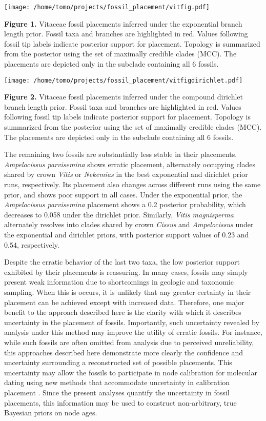 \documentclass[12pt]{article}
\begin{document}
\texttt{[image: /home/tomo/projects/fossil\_placement/vitfig.pdf]}

\textbf{Figure 1.} Vitaceae fossil placements inferred under the
exponential branch length prior. Fossil taxa and branches are
highlighted in red. Values following fossil tip labels indicate
posterior support for placement. Topology is summarized from the
posterior using the set of maximally credible clades (MCC). The placements are depicted only in the subclade containing all 6 fossils.

\texttt{[image: /home/tomo/projects/fossil\_placement/vitfigdirichlet.pdf]}

\textbf{Figure 2.}  Vitaceae fossil placements inferred
under the compound dirichlet branch length prior. Fossil taxa and
branches are highlighted in red. Values following fossil tip labels
indicate posterior support for placement. Topology is summarized from
the posterior using the set of maximally credible clades (MCC). The placements are depicted only in the subclade containing all 6 fossils.

The remaining two fossils are substantially less stable in their
placements. \emph{Ampelocissus parvisemina} shows erratic placement,
alternately occupying clades shared by crown \emph{Vitis} or
\emph{Nekemias} in the best exponential and dirichlet prior runs,
respectively. Its placement also changes across different runs using the
same prior, and shows poor support in all cases. Under the exponential
prior, the \emph{Ampelocissus parvisemina} placement shows a 0.2
posterior probability, which decreases to 0.058 under the dirichlet
prior. Similarly, \emph{Vitis magnisperma} alternately resolves into
clades shared by crown \emph{Cissus} and \emph{Ampelocissus} under the
exponential and dirichlet priors, with posterior support values of 0.23
and 0.54, respectively.

Despite the  erratic behavior of the last
two taxa, the low posterior support exhibited by their placements is
reassuring. In many cases, fossils may simply present weak information
due to shortcomings in geologic and taxonomic sampling. When this is
occurs, it is unlikely that any greater certainty in their placement can
be achieved except with increased data. Therefore, one major benefit to
the approach described here is the clarity with which it
describes uncertainty in the placement of fossils. Importantly, such
uncertainty revealed by analysis under this method may improve the
utility of erratic fossils. For instance, while such fossils are often
omitted from analysis due to perceived unreliability, this approaches
described here demonstrate more clearly the confidence and uncertainty
surrounding a reconstructed set of possible placements. This uncertainty
may allow the fossils to participate in node calibration for molecular
dating using new methods that accommodate uncertainty in calibration
placement \citep{heath2014fossilized,guindon2018accounting}. Since the present analyses
quantify the uncertainty in fossil placements, this information may be
used to construct non-arbitrary, true Bayesian priors on node ages.
\end{document}
